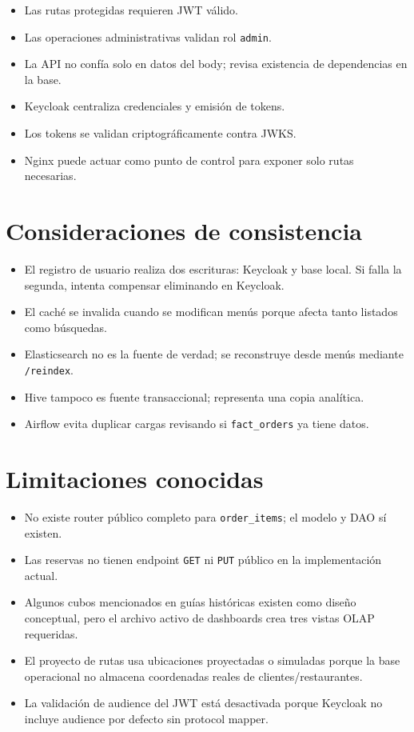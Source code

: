 \documentclass[12pt,letterpaper]{article}
\def\codefile#1{\nolinkurl{#1}}
\begin{document}
\begin{itemize}
    \item Las rutas protegidas requieren JWT válido.
    \item Las operaciones administrativas validan rol \codefile{admin}.
    \item La API no confía solo en datos del body; revisa existencia de dependencias en la base.
    \item Keycloak centraliza credenciales y emisión de tokens.
    \item Los tokens se validan criptográficamente contra JWKS.
    \item Nginx puede actuar como punto de control para exponer solo rutas necesarias.
\end{itemize}

\section{Consideraciones de consistencia}

\begin{itemize}
    \item El registro de usuario realiza dos escrituras: Keycloak y base local. Si falla la segunda, intenta compensar eliminando en Keycloak.
    \item El caché se invalida cuando se modifican menús porque afecta tanto listados como búsquedas.
    \item Elasticsearch no es la fuente de verdad; se reconstruye desde menús mediante \codefile{/reindex}.
    \item Hive tampoco es fuente transaccional; representa una copia analítica.
    \item Airflow evita duplicar cargas revisando si \codefile{fact\_orders} ya tiene datos.
\end{itemize}

\section{Limitaciones conocidas}

\begin{itemize}
    \item No existe router público completo para \codefile{order\_items}; el modelo y DAO sí existen.
    \item Las reservas no tienen endpoint \codefile{GET} ni \codefile{PUT} público en la implementación actual.
    \item Algunos cubos mencionados en guías históricas existen como diseño conceptual, pero el archivo activo de dashboards crea tres vistas OLAP requeridas.
    \item El proyecto de rutas usa ubicaciones proyectadas o simuladas porque la base operacional no almacena coordenadas reales de clientes/restaurantes.
    \item La validación de audience del JWT está desactivada porque Keycloak no incluye audience por defecto sin protocol mapper.
\end{itemize}
\end{document}

